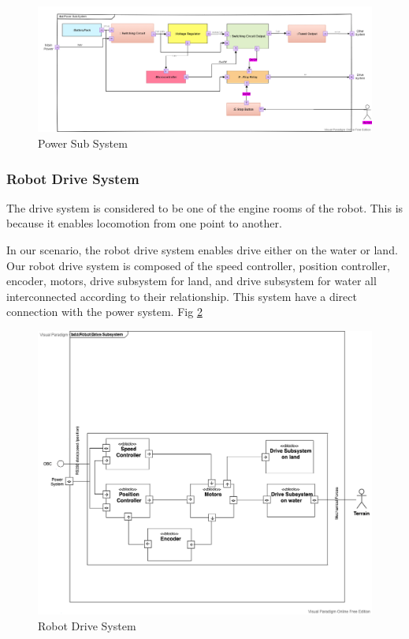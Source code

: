 \documentclass[10pt,journal,compsoc]{IEEEtran}
\begin{document}
\begin{figure}[h]
\includegraphics[scale=0.24]{Powerss}
\caption{Power Sub System}
\label{fig:powerss}
\end{figure}

\subsubsection{Robot Drive System}

The drive system is considered to be one of the engine rooms of the robot. This is because it enables locomotion from one point to another. 

In our scenario, the robot drive system enables drive either on the water or land. Our robot drive system is composed of the speed controller, position controller, encoder, motors, drive subsystem for land, and drive subsystem for water all interconnected according to their relationship. This system have a direct connection with the power system. Fig \ref{fig:Drivess}

\begin{figure}[h]
\includegraphics[scale=0.25]{Drivess}
\caption{Robot Drive System}
\label{fig:Drivess}
\end{figure}
\end{document}
